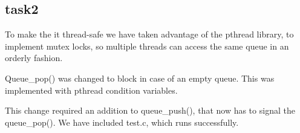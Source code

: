 \documentclass[11pt,a4paper]{report}
\begin{document}
\subsection{task2}

To make the it thread-safe we have taken advantage of the pthread library, to implement mutex locks, so multiple threads can access the same queue in an orderly fashion.

Queue\_pop() was changed to block in case of an empty queue. This was implemented with pthread condition variables.

This change required an addition to queue\_push(), that now has to signal the queue\_pop().
We have included test.c, which runs successfully.
\end{document}
